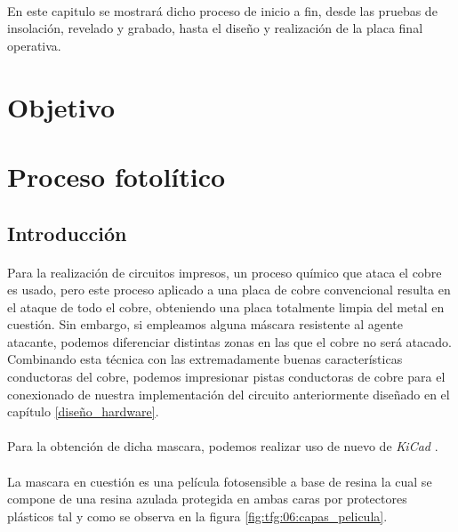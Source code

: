 \paragraph{} En este capitulo se mostrará dicho proceso de inicio a fin, desde las pruebas de insolación, revelado y grabado, hasta el diseño y realización de la placa final operativa.

\section{Objetivo}

\section{Proceso fotolítico}
\subsection{Introducción}
\paragraph{} Para la realización de circuitos impresos, un proceso químico que ataca el cobre es usado, pero este proceso aplicado a una placa de cobre convencional resulta en el ataque de todo el cobre, obteniendo una placa totalmente limpia del metal en cuestión. Sin embargo, si empleamos alguna máscara resistente al agente atacante, podemos diferenciar distintas zonas en las que el cobre no será atacado. Combinando esta técnica con las extremadamente buenas características conductoras del cobre, podemos impresionar pistas conductoras de cobre para el conexionado de nuestra implementación del circuito anteriormente diseñado en el capítulo \ref{diseño_hardware}.

\paragraph{} Para la obtención de dicha mascara, podemos realizar uso de nuevo de \textit{KiCad} \cite{kicad}.

\paragraph{} La mascara en cuestión es una película fotosensible a base de resina \cite{douglas} la cual se compone de una resina azulada protegida en ambas caras por protectores plásticos tal y como se observa en la figura \ref{fig:tfg:06:capas_pelicula}.


